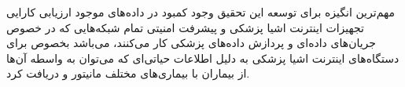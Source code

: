 مهم‌ترین انگیزه برای توسعه این تحقیق وجود کمبود در داده‌های موجود ارزیابی کارایی
تجهیزات اینترنت اشیا پزشکی و پیشرفت امنیتی تمام شبکه‌هایی که در خصوص جریان‌های
داده‌ای و پردازش داده‌های پزشکی کار می‌کنند، می‌باشد بخصوص برای دستگاه‌های
اینترنت اشیا پزشکی به دلیل اطلاعات حیاتی‌ای که می‌توان به واسطه آن‌ها از بیماران
با بیماری‌های مختلف مانیتور و دریافت کرد.


